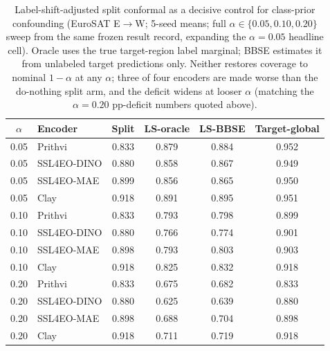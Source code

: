 \documentclass[11pt]{article}
\begin{document}
\begin{table}[t]\centering\small
\caption{Label-shift-adjusted split conformal \citep{podkopaev2021labelshift} as a decisive control for
class-prior confounding (EuroSAT E$\to$W; 5-seed means; full $\alpha\in\{0.05,0.10,0.20\}$ sweep from the
same frozen result record, expanding the $\alpha{=}0.05$ headline cell). Oracle uses the true target-region
label marginal; BBSE \citep{lipton2018bbse} estimates it from unlabeled target predictions only. Neither
restores coverage to nominal $1{-}\alpha$ at any $\alpha$; three of four encoders are made worse than the
do-nothing split arm, and the deficit widens at looser $\alpha$ (matching the $\alpha=0.20$ pp-deficit
numbers quoted above).}\label{tab:labelshift}
\begin{tabular}{clcccc}
\toprule
$\alpha$ & Encoder & Split & LS-oracle & LS-BBSE & Target-global \\
\midrule
0.05 & Prithvi     & 0.833 & 0.879 & 0.884 & 0.952 \\
0.05 & SSL4EO-DINO & 0.880 & 0.858 & 0.867 & 0.949 \\
0.05 & SSL4EO-MAE  & 0.899 & 0.856 & 0.865 & 0.950 \\
0.05 & Clay        & 0.918 & 0.891 & 0.895 & 0.951 \\
\midrule
0.10 & Prithvi     & 0.833 & 0.793 & 0.798 & 0.899 \\
0.10 & SSL4EO-DINO & 0.880 & 0.766 & 0.774 & 0.901 \\
0.10 & SSL4EO-MAE  & 0.898 & 0.793 & 0.803 & 0.903 \\
0.10 & Clay        & 0.918 & 0.825 & 0.832 & 0.918 \\
\midrule
0.20 & Prithvi     & 0.833 & 0.675 & 0.682 & 0.833 \\
0.20 & SSL4EO-DINO & 0.880 & 0.625 & 0.639 & 0.880 \\
0.20 & SSL4EO-MAE  & 0.898 & 0.688 & 0.704 & 0.898 \\
0.20 & Clay        & 0.918 & 0.711 & 0.719 & 0.918 \\
\bottomrule
\end{tabular}
\end{table}
\end{document}
